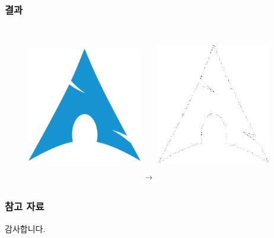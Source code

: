 \documentclass{beamer}
\begin{document}
	\begin{frame}{}
		\frametitle{결과}
		\begin{figure}
			\centering
			\includegraphics[align=c, width=5cm, height=7cm]{Input.png}
			\includegraphics[align=c, width=0.5cm, height=0.5cm]{Rightarrow.png}
			\includegraphics[align=c, width=5cm, height=7cm]{StructureBasedOutput.pdf}
		\end{figure}
	\end{frame}
	\begin{frame}{}
		\frametitle{참고 자료}
		
		\tiny{}
	\end{frame}
	\begin{frame}
		\centering
		감사합니다.
	\end{frame}
\end{document}
